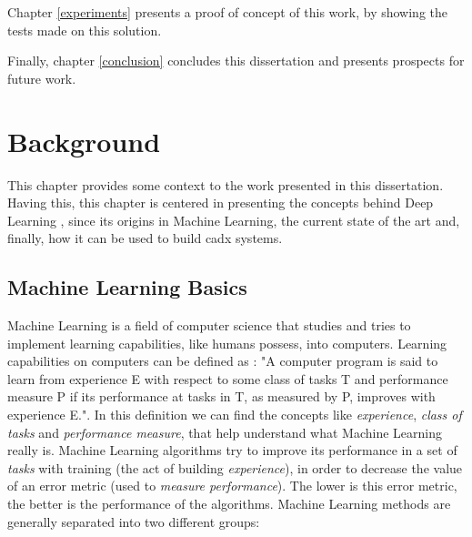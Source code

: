 \documentclass[
  twoside,
  11pt, a4paper,
  footinclude=true,
  headinclude=true,
  cleardoublepage=empty
]{scrbook}
\begin{document}
      Chapter \ref{experiments} presents a proof of concept of this work, by showing the tests made on this solution.

      Finally, chapter \ref{conclusion} concludes this dissertation and presents prospects for future work.

  \chapter{Background} \label{background}
    This chapter provides some context to the work presented in this dissertation. Having this, this chapter is centered in presenting the concepts behind Deep Learning , since its origins in Machine Learning, the current state of the art and, finally, how it can be used to build \gls{cadx} systems.

    \section{Machine Learning Basics} \label{background:machine-learning}
      Machine Learning is a field of computer science that studies and tries to implement learning capabilities, like humans possess, into computers. Learning capabilities on computers can be defined as \cite{mitchell1997machine}: "A computer program is said to learn from experience E with respect to some class of tasks T and performance measure P if its performance at tasks in T, as measured by P, improves with experience E.". In this definition we can find the concepts like \textit{experience}, \textit{class of tasks} and \textit{performance measure}, that help understand what Machine Learning really is. Machine Learning algorithms try to improve its performance in a set of \textit{tasks} with training (the act of building \textit{experience}), in order to decrease the value of an error metric (used to \textit{measure performance}). The lower is this error metric, the better is the performance of the algorithms. Machine Learning methods are generally separated into two different groups:
\end{document}

